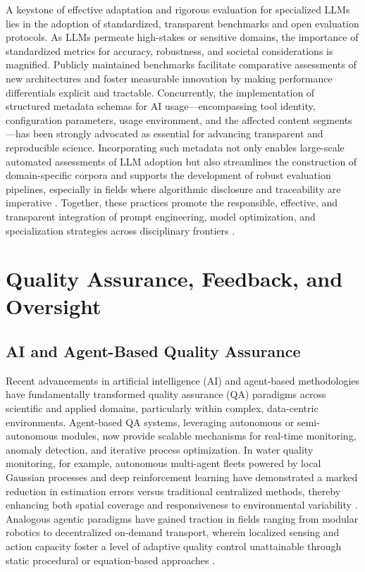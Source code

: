 \documentclass[sigconf]{acmart}
\begin{document}
A keystone of effective adaptation and rigorous evaluation for specialized LLMs lies in the adoption of standardized, transparent benchmarks and open evaluation protocols. As LLMs permeate high-stakes or sensitive domains, the importance of standardized metrics for accuracy, robustness, and societal considerations is magnified. Publicly maintained benchmarks facilitate comparative assessments of new architectures and foster measurable innovation by making performance differentials explicit and tractable. Concurrently, the implementation of structured metadata schemas for AI usage---encompassing tool identity, configuration parameters, usage environment, and the affected content segments---has been strongly advocated as essential for advancing transparent and reproducible science. Incorporating such metadata not only enables large-scale automated assessments of LLM adoption but also streamlines the construction of domain-specific corpora and supports the development of robust evaluation pipelines, especially in fields where algorithmic disclosure and traceability are imperative \cite{ref106}. Together, these practices promote the responsible, effective, and transparent integration of prompt engineering, model optimization, and specialization strategies across disciplinary frontiers \cite{ref104}\cite{ref106}.

\section{Quality Assurance, Feedback, and Oversight}

\subsection{AI and Agent-Based Quality Assurance}

Recent advancements in artificial intelligence (AI) and agent-based methodologies have fundamentally transformed quality assurance (QA) paradigms across scientific and applied domains, particularly within complex, data-centric environments. Agent-based QA systems, leveraging autonomous or semi-autonomous modules, now provide scalable mechanisms for real-time monitoring, anomaly detection, and iterative process optimization. In water quality monitoring, for example, autonomous multi-agent fleets powered by local Gaussian processes and deep reinforcement learning have demonstrated a marked reduction in estimation errors versus traditional centralized methods, thereby enhancing both spatial coverage and responsiveness to environmental variability \cite{ref92}. Analogous agentic paradigms have gained traction in fields ranging from modular robotics to decentralized on-demand transport, wherein localized sensing and action capacity foster a level of adaptive quality control unattainable through static procedural or equation-based approaches \cite{ref93}\cite{ref97}\cite{ref98}\cite{ref115}.
\end{document}
